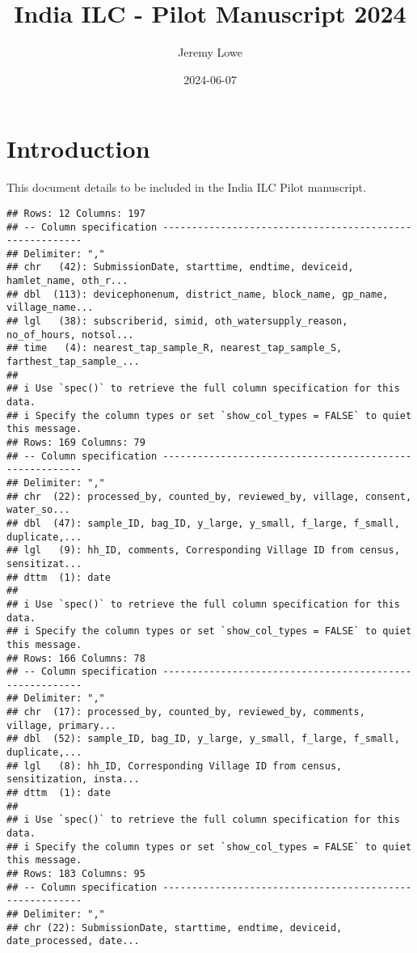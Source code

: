\documentclass[
]{article}
\title{India ILC - Pilot Manuscript 2024}
\author{Jeremy Lowe}
\date{2024-06-07}
\begin{document}
\maketitle

\hypertarget{introduction}{%
\section{Introduction}\label{introduction}}

This document details to be included in the India ILC Pilot manuscript.

\begin{verbatim}
## Rows: 12 Columns: 197
## -- Column specification --------------------------------------------------------
## Delimiter: ","
## chr   (42): SubmissionDate, starttime, endtime, deviceid, hamlet_name, oth_r...
## dbl  (113): devicephonenum, district_name, block_name, gp_name, village_name...
## lgl   (38): subscriberid, simid, oth_watersupply_reason, no_of_hours, notsol...
## time   (4): nearest_tap_sample_R, nearest_tap_sample_S, farthest_tap_sample_...
## 
## i Use `spec()` to retrieve the full column specification for this data.
## i Specify the column types or set `show_col_types = FALSE` to quiet this message.
## Rows: 169 Columns: 79
## -- Column specification --------------------------------------------------------
## Delimiter: ","
## chr  (22): processed_by, counted_by, reviewed_by, village, consent, water_so...
## dbl  (47): sample_ID, bag_ID, y_large, y_small, f_large, f_small, duplicate,...
## lgl   (9): hh_ID, comments, Corresponding Village ID from census, sensitizat...
## dttm  (1): date
## 
## i Use `spec()` to retrieve the full column specification for this data.
## i Specify the column types or set `show_col_types = FALSE` to quiet this message.
## Rows: 166 Columns: 78
## -- Column specification --------------------------------------------------------
## Delimiter: ","
## chr  (17): processed_by, counted_by, reviewed_by, comments, village, primary...
## dbl  (52): sample_ID, bag_ID, y_large, y_small, f_large, f_small, duplicate,...
## lgl   (8): hh_ID, Corresponding Village ID from census, sensitization, insta...
## dttm  (1): date
## 
## i Use `spec()` to retrieve the full column specification for this data.
## i Specify the column types or set `show_col_types = FALSE` to quiet this message.
## Rows: 183 Columns: 95
## -- Column specification --------------------------------------------------------
## Delimiter: ","
## chr (22): SubmissionDate, starttime, endtime, deviceid, date_processed, date...

\end{verbatim}
\end{document}
